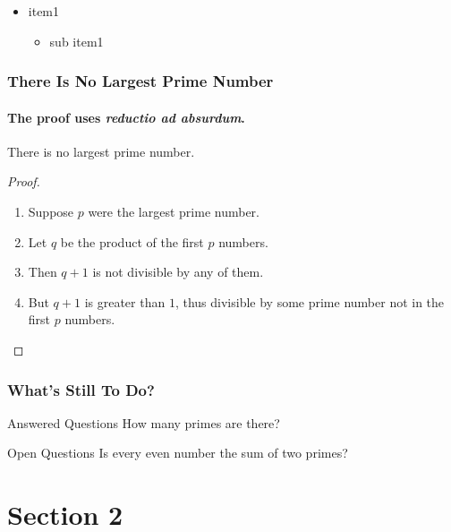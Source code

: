 \documentclass[]{beamer}
\begin{document}
\begin{CJK*}{UTF8}{}
{  \begin{itemize}%
    \item item1
      \begin{itemize}
        \item{sub item1}
      \end{itemize}
  \end{itemize}
}
\begin{frame}
  \frametitle{There Is No Largest Prime Number}
  \framesubtitle{The proof uses \textit{reductio ad absurdum}.}
  \begin{theorem}
    There is no largest prime number.
  \end{theorem}
  \begin{proof}
    \begin{enumerate}
      \item<1-> Suppose $p$ were the largest prime number.
      \item<2-> Let $q$ be the product of the first $p$ numbers.
      \item<3-> Then $q + 1$ is not divisible by any of them.
      \item<1-> But $q + 1$ is greater than $1$, thus divisible by some prime
  number not in the first $p$ numbers.\qedhere
    \end{enumerate}
  \end{proof}
\end{frame}
\begin{frame}
  \frametitle{What’s Still To Do?}
  \begin{block}{Answered Questions}
    How many primes are there?
  \end{block}
  \begin{block}{Open Questions}
    Is every even number the sum of two primes?
  \end{block}
\end{frame}
\section{Section 2}


\end{CJK*}
\end{document}
